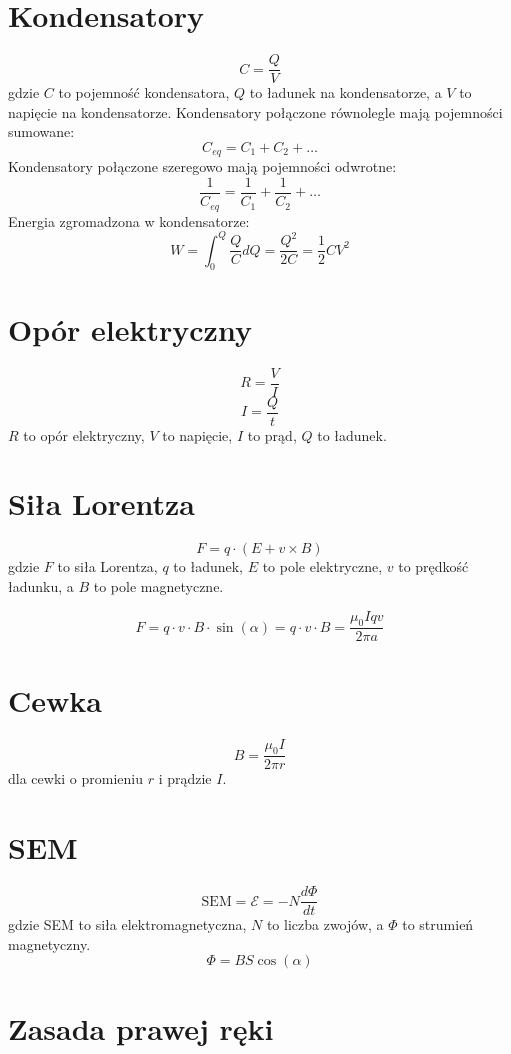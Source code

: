 \documentclass{../konspekt}
\begin{document}
\begin{multicols}{2}
  \section{Kondensatory}

  $$
  C = \frac{Q}{V}
  $$
  gdzie $C$ to pojemność kondensatora, $Q$ to ładunek na
  kondensatorze, a $V$ to napięcie na kondensatorze. Kondensatory połączone
  równolegle mają pojemności sumowane:
  $$
  C_{eq} = C_1 + C_2 + \ldots
  $$
  Kondensatory połączone szeregowo mają pojemności odwrotne:
  $$
  \frac{1}{C_{eq}} = \frac{1}{C_1} + \frac{1}{C_2} + \ldots
  $$
  Energia zgromadzona w kondensatorze:
  $$
  W = \int_{0}^{Q} \frac{Q}{C} dQ = \frac{Q^2}{2C} = \frac{1}{2} C V^2
  $$

  \section{Opór elektryczny}

  $$
  R = \frac{V}{I}
  $$
  $$
  I = \frac{Q}{t}
  $$
  $R$ to opór elektryczny, $V$ to napięcie, $I$ to prąd,
  $Q$ to ładunek.

  \section{Siła Lorentza}

  $$
  F = q \cdot (E + v \times B)
  $$
  gdzie $F$ to siła Lorentza, $q$ to ładunek, $E$ to pole elektryczne,
  $v$ to prędkość ładunku, a $B$ to pole magnetyczne.

  $$
  F = q \cdot v \cdot B \cdot \sin(\alpha) = q \cdot v \cdot B =
  \frac{\mu_0 I q v}{2\pi a}
  $$

  \section{Cewka}

  $$
  B = \frac{\mu_0 I}{2\pi r}
  $$
  dla cewki o promieniu $r$ i prądzie $I$.

  \section{SEM}

  $$
  \text{SEM} = \mathcal{E} = -N \frac{d \Phi}{dt}
  $$
  gdzie SEM to siła elektromagnetyczna, $N$ to liczba zwojów, a $\Phi$
  to strumień magnetyczny.
  $$
  \Phi = BS \cos(\alpha)
  $$

  \section{Zasada prawej ręki}


\end{multicols}
\end{document}
